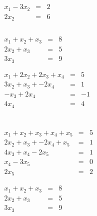 \begin{questions}
	\question $ \begin{array}{rcl}& & \\ x_1 - 3x_2 & = & 2 \\ 2 x_2 & = & 6 \end{array}$


\question  $ \begin{array}{rcl}& & \\& &  \\ x_1 + x_2 +x_3 & = & 8 \\ 2 x_2 +x_3 & = & 5 \\ 3x_3 & = & 9 \end{array}$ \\

\question  $ \begin{array}{rcl}
& & \\ 
& & \\ 
x_1 +2x_2 + 2x_3 + x_4 & = & 5  \\
          3x_2 +  x_3 + -2x_4 & = & 1 \\ 
                         -x_3 + 2x_4 & = & -1 \\ 
                                      4x_4 & = & 4   \end{array}$

\question  $ \begin{array}{rcl}
& & \\ 
& & \\ 
& & \\ 
& & \\ 
x_1 +x_2 + x_3 + x_4  + x_5 & = & 5  \\
          2x_2 +  x_3 + -2x_4 + x_5 & = & 1 \\ 
                         4x_3 + x_4-2 x_5 & = & 1 \\ 
                                      x_4 -3 x_5 & = & 0 \\
                                                    2x_5 & = & 2   \end{array}$



 
 


 
\question $\begin{array}{rcl} x_1 + x_2 +x_3 & = & 8 \\ 2 x_2 +x_3 & = & 5 \\ 3x_3 & = & 9 \end{array}$
 

\end{questions}
